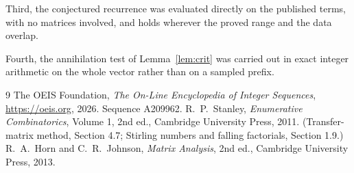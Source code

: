 \documentclass[11pt,a4paper]{article}
\theoremstyle{plain}
\theoremstyle{definition}
\begin{document}
Third, the conjectured recurrence was evaluated directly on the published terms, with no
matrices involved, and holds wherever the proved range and the data overlap.

Fourth, the annihilation test of Lemma~\ref{lem:crit} was carried out in exact integer
arithmetic on the whole vector rather than on a sampled prefix.

\begin{thebibliography}{9}
 The OEIS Foundation, \emph{The On-Line Encyclopedia of Integer
Sequences}, \url{https://oeis.org}, 2026. Sequence A209962.
 R.~P.~Stanley, \emph{Enumerative Combinatorics}, Volume 1, 2nd ed.,
Cambridge University Press, 2011. (Transfer-matrix method, Section 4.7; Stirling numbers and
falling factorials, Section 1.9.)
 R.~A.~Horn and C.~R.~Johnson, \emph{Matrix Analysis}, 2nd ed., Cambridge
University Press, 2013.
\end{thebibliography}
\end{document}
